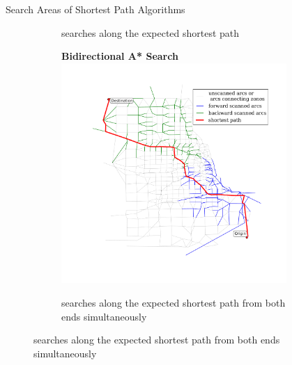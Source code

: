 \documentclass[final]{beamer}
\begin{document}
\begin{frame}{ }
\begin{columns}[t]
\begin{column}{.4\linewidth}
\begin{block}{Search Areas of Shortest Path Algorithms}
\begin{figure}
\begin{subfigure}{.5\linewidth}
                        \caption{searches along the expected shortest path}
                    \end{subfigure}%
                    \begin{subfigure}{.5\linewidth}
                        \centering
                        {\bfseries Bidirectional A* Search}
                        \includegraphics[width=\linewidth,trim=120px 120px 48px 60px,clip]{img/astar_bidirect}
                        \caption{searches along the expected shortest path from both ends simultaneously} 
                    \end{subfigure}
                \end{figure}
            \end{block}

        \end{column}
        \begin{column}{.28\linewidth}
            

\end{column}
\end{columns}
\end{frame}
\end{document}
